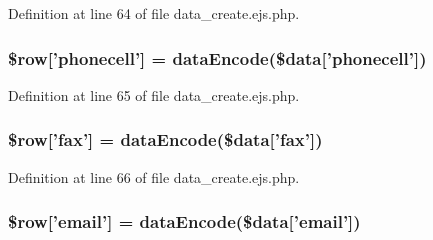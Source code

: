 \-Definition at line 64 of file data\-\_\-create.\-ejs.\-php.

\hypertarget{miscellaneous_2mysettings_2data__create_8ejs_8php_a0517e1ea0f1ef22772f36b37a743d1be}{
\subsubsection[{\$row}]{\setlength{\rightskip}{0pt plus 5cm}\$row\mbox{[}'phonecell'\mbox{]} = {\bf data\-Encode}(\$data\mbox{[}'phonecell'\mbox{]})}}\label{miscellaneous_2mysettings_2data__create_8ejs_8php_a0517e1ea0f1ef22772f36b37a743d1be}


\-Definition at line 65 of file data\-\_\-create.\-ejs.\-php.

\hypertarget{miscellaneous_2mysettings_2data__create_8ejs_8php_addcf6434ea14720a2fb19d21dc55a8c9}{
\subsubsection[{\$row}]{\setlength{\rightskip}{0pt plus 5cm}\$row\mbox{[}'fax'\mbox{]} = {\bf data\-Encode}(\$data\mbox{[}'fax'\mbox{]})}}\label{miscellaneous_2mysettings_2data__create_8ejs_8php_addcf6434ea14720a2fb19d21dc55a8c9}


\-Definition at line 66 of file data\-\_\-create.\-ejs.\-php.

\hypertarget{miscellaneous_2mysettings_2data__create_8ejs_8php_a40ee16d8fb0e37c2da5cf0da20f73f1d}{
\subsubsection[{\$row}]{\setlength{\rightskip}{0pt plus 5cm}\$row\mbox{[}'email'\mbox{]} = {\bf data\-Encode}(\$data\mbox{[}'email'\mbox{]})}}\label{miscellaneous_2mysettings_2data__create_8ejs_8php_a40ee16d8fb0e37c2da5cf0da20f73f1d}


